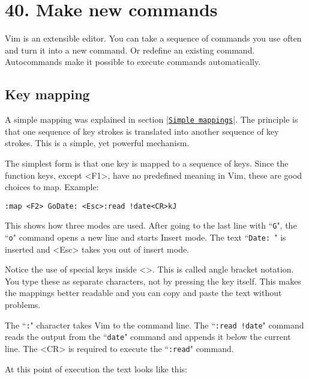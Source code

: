\section{40. Make new commands}
Vim is an extensible editor.
You can take a sequence of commands you use often and turn it into a new command.
Or redefine an existing command.
Autocommands make it possible to execute commands automatically.
\localtableofcontents
\subsection{Key mapping}
\label{Key mapping}
A simple mapping was explained in section |\hyperref[Simple mappings]{\texttt{Simple mappings}}|.
The principle is that one sequence of key strokes is translated into another sequence of key strokes.
This is a simple, yet powerful mechanism.

The simplest form is that one key is mapped to a sequence of keys.
Since the function keys, except <F1>, have no predefined meaning in Vim, these are good choices to map.
Example:

\begin{Verbatim}[samepage=true]
 :map <F2> GoDate: <Esc>:read !date<CR>kJ
\end{Verbatim}

This shows how three modes are used.
After going to the last line with ``\texttt{G}", the ``\texttt{o}" command opens a new line and starts Insert mode.
The text ``\texttt{Date: }" is inserted and <Esc> takes you out of insert mode.

Notice the use of special keys inside <>.
This is called angle bracket notation.
You type these as separate characters, not by pressing the key itself.
This makes the mappings better readable and you can copy and paste the text without problems.

The ``\texttt{:}" character takes Vim to the command line.
The ``\texttt{:read !date}" command reads the output from the ``\texttt{date}" command and appends it below the current line.
The <CR> is required to execute the ``\texttt{:read}" command.

At this point of execution the text looks like this:

